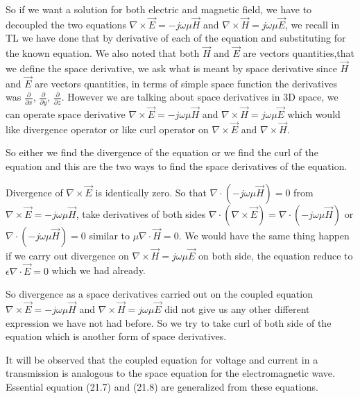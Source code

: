 		So if we want a solution for both electric and magnetic field, we have to decoupled the two equations  $\nabla\times\vec{E}=-j\omega\mu\vec{H}$ and $\nabla\times\vec{H}=j\omega\mu\vec{E}$,  we recall in TL we have done that by derivative of each of the equation and substituting for the known equation. We also noted that both $\vec{H}$ and $\vec{E}$ are vectors quantities,that we define the space derivative, we ask what is meant by space derivative since $\vec{H}$ and $\vec{E}$ are vectors quantities, in terms of simple space function the derivatives was $\frac{\partial}{\partial x}$, $\frac{\partial}{\partial y}$, $\frac{\partial}{\partial z}$. However we are talking about space derivatives in 3D space, we can operate space derivative $\nabla\times\vec{E}=-j\omega\mu\vec{H}$ and $\nabla\times\vec{H}=j\omega\mu\vec{E}$ which would like divergence operator or like curl operator on $\nabla\times\vec{E}$ and $\nabla\times\vec{H}$. 
		
		
		So either we find the divergence of the equation or we find the curl of the equation and this are the two ways to find the space derivatives of the equation.
		
		\bigskip
		
		Divergence of $\nabla\times\vec{E}$  is identically zero. So that $\nabla\cdot(-j\omega\mu\vec{H})=0$ from $\nabla\times\vec{E}=-j\omega\mu\vec{H}$, take derivatives of both sides $\nabla\cdot(\nabla\times\vec{E})=\nabla\cdot(-j\omega\mu\vec{H})$ or $\nabla\cdot(-j\omega\mu\vec{H})=0$  similar to $\mu\nabla\cdot\vec{H}=0$. We would have the same thing happen if we carry out divergence on $\nabla\times\vec{H}=j\omega\mu\vec{E}$ on both side, the equation reduce to $\epsilon\nabla\cdot\vec{E}=0$ which we had already.
		
		\bigskip
		
		So divergence as a space derivatives carried out on the coupled equation $\nabla\times\vec{E}=-j\omega\mu\vec{H}$ and $\nabla\times\vec{H}=j\omega\mu\vec{E}$ did not give us any other different expression we have not had before. So we try to take curl of both side of the equation which is another form of space derivatives.
		
		
	
		\bigskip
		
		
		It will be observed that the coupled equation for voltage and current in a transmission is analogous to the space equation for the electromagnetic wave. Essential equation (21.7) and (21.8) are generalized from these equations.
		
